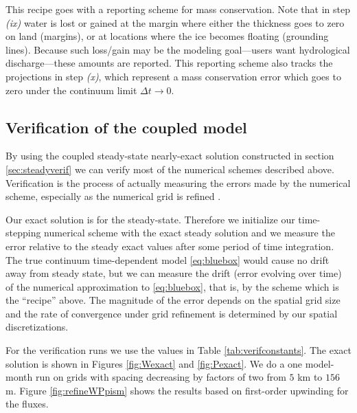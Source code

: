 \documentclass[11pt,final]{amsart}
\begin{document}
\medskip
This recipe goes with a reporting scheme for mass conservation.  Note that in step \emph{(ix)} water is lost or gained at the margin where either the thickness goes to zero on land (margins), or at locations where the ice becomes floating (grounding lines).  Because such loss/gain may be the modeling goal---users want hydrological discharge---these amounts are reported.  This reporting scheme also tracks the projections in step \emph{(x)}, which represent a mass conservation error which goes to zero under the continuum limit $\Delta t\to 0$.

\subsection*{Verification of the coupled model}  By using the coupled steady-state nearly-exact solution constructed in section \ref{sec:steadyverif} we can verify most of the numerical schemes described above.  Verification is the process of actually measuring the errors made by the numerical scheme, especially as the numerical grid is refined \citep[for example]{Wesseling}.

Our exact solution is for the steady-state.  Therefore we initialize our time-stepping numerical scheme with the exact steady solution and we measure the error relative to the steady exact values after some period of time integration.  The true continuum time-dependent model \eqref{eq:bluebox} would cause no drift away from steady state, but we can measure the drift (error evolving over time) of the numerical approximation to \eqref{eq:bluebox}, that is, by the scheme which is the ``recipe'' above.  The magnitude of the error depends on the spatial grid size and the rate of convergence under grid refinement is determined by our spatial discretizations.

For the verification runs we use the values in Table \ref{tab:verifconstants}.  The exact solution is shown in Figures \ref{fig:Wexact} and \ref{fig:Pexact}.  We do a one model-month run on grids with spacing decreasing by factors of two from $5$ km to $156$ m.  Figure \ref{fig:refineWPpism} shows the results based on first-order upwinding for the fluxes.
\end{document}
